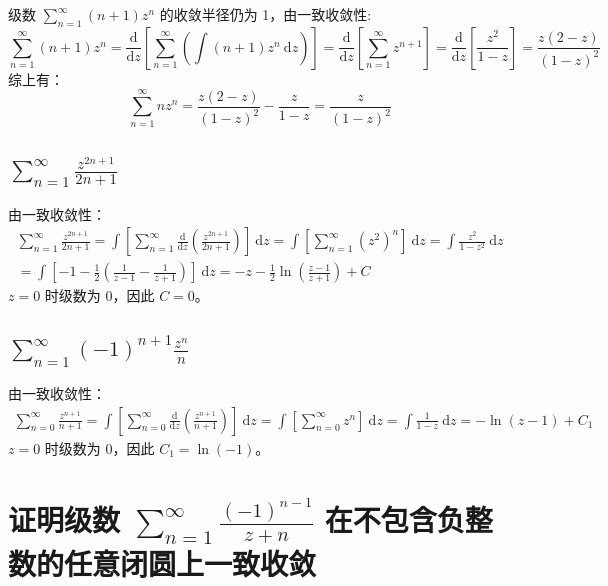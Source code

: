 \documentclass[UTF8]{report}
\theoremstyle{MyLineTheoremStyle} %
\theoremstyle{MyBlockTheoremStyle} %
\theoremstyle{MySubsubsectionStyle} %
\begin{document}
级数 $\sum_{n=1}^{\infty} (n+1) z^n$ 的收敛半径仍为 1，由一致收敛性: 
\begin{equation}
    \sum_{n=1}^{\infty} (n+1) z^n
    = \frac{\mathrm{d} }{\mathrm{d} z } \left[ \sum_{n=1}^{\infty} \left( \int (n+1) z^n \ \mathrm{d}z\right) \right]
    = \frac{\mathrm{d} }{\mathrm{d} z } \left[ \sum_{n=1}^{\infty}  z^{n+1}  \right]
    = \frac{\mathrm{d} }{\mathrm{d} z } \left[ \frac{z^2}{1 - z} \right]
    = \frac{z(2 - z)}{(1 - z)^2}
\end{equation}
综上有：
\begin{equation}
    \sum_{n=1}^{\infty} n z^n 
    = \frac{z(2 - z)}{(1 - z)^2} - \frac{z}{1 - z} 
    = \frac{z}{(1 - z)^2}
\end{equation}

\subsection{$\sum_{n=1}^{\infty} \frac{z^{2n+1}}{2n+1}$}
由一致收敛性：
\begin{gather}
    \sum_{n=1}^{\infty} \frac{z^{2n+1}}{2n+1}
    =  \int \left[ \sum_{n=1}^{\infty}  \frac{\mathrm{d} }{\mathrm{d} z }  \left(\frac{z^{2n+1}}{2n+1}\right) \right]\ \mathrm{d}z
    =  \int \left[  \sum_{n=1}^{\infty} \left(z^2\right)^{n}  \right]\ \mathrm{d}z 
    =  \int \frac{z^2}{1 - z^2} \ \mathrm{d}z \\ 
    =  \int \left[ -1 - \frac{1}{2}\left( \frac{1}{z - 1} - \frac{1}{z + 1}\right) \right] \ \mathrm{d}z
    =  - z - \frac{1}{2}\ln \left(\frac{z - 1}{z + 1}\right)  + C
\end{gather}
$z = 0$ 时级数为 0，因此 $C = 0$。

\subsection{$\sum_{n=1}^{\infty} (-1)^{n+1}\frac{z^n}{n}$}
由一致收敛性：
\begin{gather}
    \sum_{n=0}^{\infty} \frac{z^{n+1}}{n+1} 
    = \int \left[ \sum_{n=0}^{\infty}  \frac{\mathrm{d} }{\mathrm{d} z }  \left(\frac{z^{n+1}}{n+1}\right) \right]\ \mathrm{d}z
    = \int \left[  \sum_{n=0}^{\infty} z^n  \right]\ \mathrm{d}z 
    = \int \frac{1}{1 - z} \ \mathrm{d}z
    = - \ln (z - 1) + C_1
\end{gather}
$z = 0$ 时级数为 0，因此 $C_1 = \ln (-1)$。

\section{证明级数 $\sum_{n=1}^{\infty} \frac{(-1)^{n-1}}{z + n}$ 在不包含负整数的任意闭圆上一致收敛}
\end{document}
